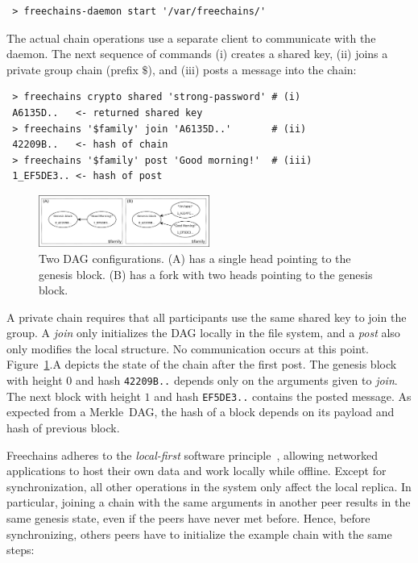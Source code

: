 \documentclass[10pt,journal,compsoc]{IEEEtran}
\newcommand{\FC}       {Freechains\xspace}
\begin{document}
{\footnotesize
\begin{verbatim}
 > freechains-daemon start '/var/freechains/'
\end{verbatim}
}

The actual chain operations use a separate client to communicate with the
daemon.
The next sequence of commands (i) creates a shared key, (ii) joins a private
group chain (prefix $\$$), and (iii) posts a message into the chain:

{\footnotesize
\begin{verbatim}
 > freechains crypto shared 'strong-password' # (i)
 A6135D..   <- returned shared key
 > freechains '$family' join 'A6135D..'       # (ii)
 42209B..   <- hash of chain
 > freechains '$family' post 'Good morning!'  # (iii)
 1_EF5DE3.. <- hash of post
\end{verbatim}
}

\begin{figure}[t]
\centering
\includegraphics[width=0.5\textwidth]{family.png}
\caption{Two DAG configurations. (A) has a single head pointing to the
genesis block. (B) has a fork with two heads pointing to the genesis block.}
\label{fig.family}
\end{figure}

A private chain requires that all participants use the same shared key to join
the group.
A \emph{join} only initializes the DAG locally in the file system, and a
\emph{post} also only modifies the local structure.
No communication occurs at this point.
Figure~\ref{fig.family}.A depicts the state of the chain after the first post.
The genesis block with height $0$ and hash \texttt{42209B..}
depends only on the arguments given to \emph{join}.
The next block with height $1$ and hash \texttt{EF5DE3..} contains the posted
message.
As expected from a Merkle~DAG, the hash of a block depends on its payload and
hash of previous block.

\FC adheres to the \emph{local-first} software principle~\cite{p2p.local},
allowing networked applications to host their own data and work locally while
offline.
Except for synchronization, all other operations in the system only affect the
local replica.
In particular, joining a chain with the same arguments in another peer results
in the same genesis state, even if the peers have never met before.
Hence, before synchronizing, others peers have to initialize the example chain
with the same steps:
\end{document}
